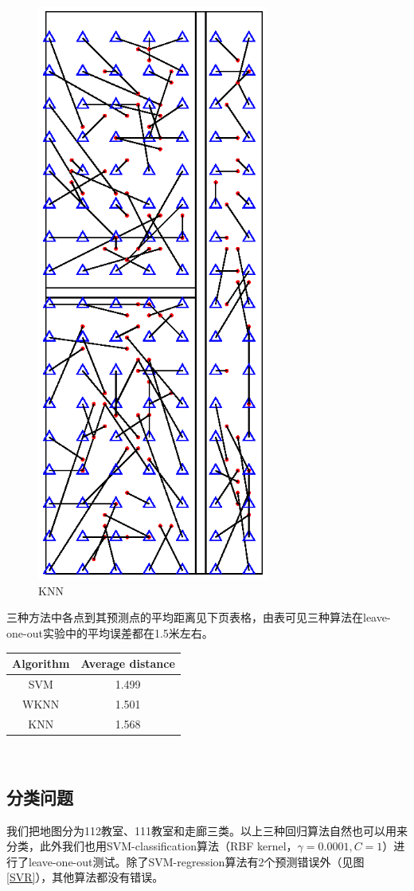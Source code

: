 \documentclass[a4paper,10pt]{article}
\begin{document}
\begin{CJK*}{UTF8}{gbsn}
\begin{figure}[h]
\begin{minipage}[t]{0.5\linewidth}
\includegraphics[width=3in]{KNN.eps}
\caption{KNN}
\label{KNN}
\end{minipage}
\end{figure}

三种方法中各点到其预测点的平均距离见下页表格，由表可见三种算法在leave-one-out实验中的平均误差都在1.5米左右。
\begin{table}[h]
\centering
\begin{tabular}{c|c}
Algorithm & Average distance\\\hline
SVM & 1.499\\
WKNN & 1.501\\
KNN & 1.568
\end{tabular}
\end{table}\\


\subsection{分类问题}
我们把地图分为112教室、111教室和走廊三类。以上三种回归算法自然也可以用来分类，此外我们也用SVM-classification算法（RBF kernel，$\gamma = 0.0001, C = 1$）进行了leave-one-out测试。除了SVM-regression算法有2个预测错误外（见图\eqref{SVR}），其他算法都没有错误。




\end{CJK*}
\end{document}
